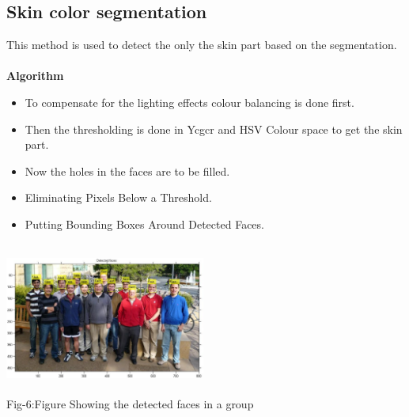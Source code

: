 \documentclass[final,3p,times,twocolumn,sort&compress]{elsarticle}
\begin{document}
\subsection{Skin color segmentation}
This method is used to detect the only the skin part based on the segmentation\cite{four}.\\ $ $\\
\textbf{Algorithm}
\begin{itemize}
\item To compensate for the lighting effects colour balancing is done first.
\item Then the thresholding is done in Ycgcr and HSV Colour space to get the skin part.
\item Now the holes in the faces are to be filled.
\item  Eliminating Pixels Below a Threshold.
\item Putting Bounding Boxes Around Detected Faces.
\end{itemize}

\begin{center}
 \includegraphics[width=6.6cm,height=5cm]{det_pic}\\
  Fig-6:Figure Showing the detected faces in a group\\
 \end{center}
\end{document}
